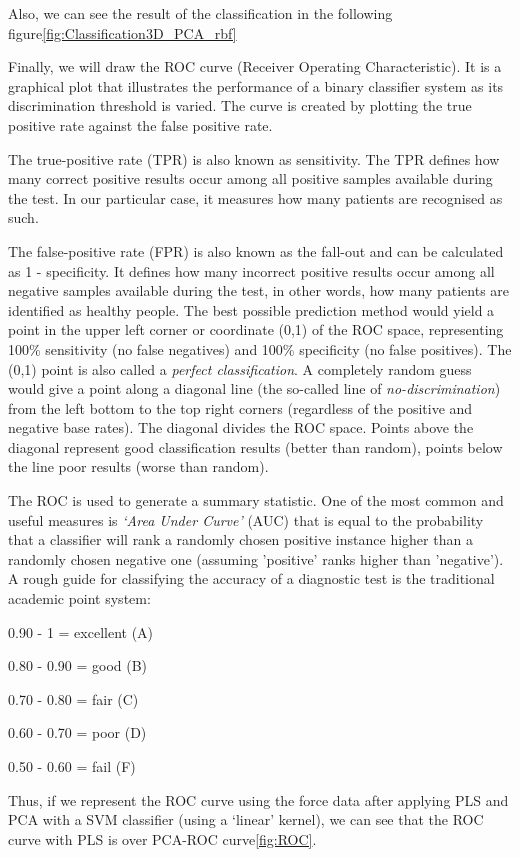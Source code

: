 Also, we can see the result of the classification in the following figure\ref{fig:Classification3D_PCA_rbf}

Finally, we will draw the ROC curve (Receiver Operating Characteristic). It is a graphical plot that illustrates the performance of a binary classifier system as its discrimination threshold is varied. The curve is created by plotting the true positive rate against the false positive rate\cite{ROC1}.

The true-positive rate (TPR) is also known as sensitivity. The TPR defines how many correct positive results occur among all positive samples available during the test. In our particular case, it measures how many patients are recognised as such.

The false-positive rate (FPR) is also known as the fall-out and can be calculated as 1 - specificity. It defines how many incorrect positive results occur among all negative samples available during the test, in other words, how many patients are identified as healthy people.
The best possible prediction method would yield a point in the upper left corner or coordinate (0,1) of the ROC space, representing 100\% sensitivity (no false negatives) and 100\% specificity (no false positives). The (0,1) point is also called a \textit{perfect classification}. A completely random guess would give a point along a diagonal line (the so-called line of \textit{no-discrimination}) from the left bottom to the top right corners (regardless of the positive and negative base rates). The diagonal divides the ROC space. Points above the diagonal represent good classification results (better than random), points below the line poor results (worse than random)\cite{ROC1}.

The ROC is used to generate a summary statistic. One of the most common and useful measures is \textit{‘Area Under Curve’} (AUC) that is equal to the probability that a classifier will rank a randomly chosen positive instance higher than a randomly chosen negative one (assuming 'positive' ranks higher than 'negative'). A rough guide for classifying the accuracy of a diagnostic test is the traditional academic point system\cite{ROC2}:

0.90 - 1 = excellent (A)

0.80 - 0.90 = good (B)	

0.70 - 0.80 = fair (C)

0.60 - 0.70 = poor (D)

0.50 - 0.60 = fail (F)

Thus, if we represent the ROC curve using the force data after applying PLS and PCA with a SVM classifier (using a ‘linear’ kernel), we can see that the ROC curve with PLS is over PCA-ROC curve\ref{fig:ROC}.

